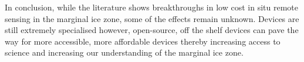 In conclusion, while the literature shows breakthroughs in low cost in situ remote sensing in the marginal ice zone, some of the effects remain unknown. Devices are still extremely specialised however, open-source, off the shelf devices can pave the way for more accessible, more affordable devices thereby increasing access to science and increasing our understanding of the marginal ice zone.